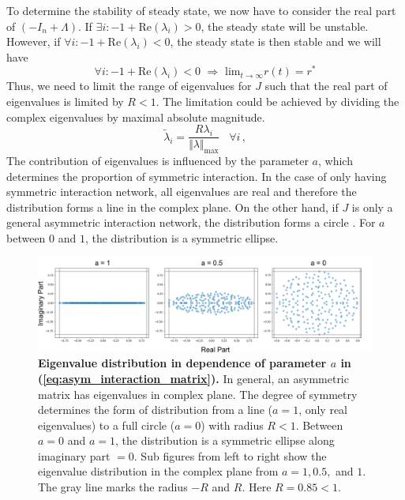 \documentclass[11pt]{article}
\begin{document}
	To determine the stability of steady state, we now have to consider the real part of $(-I_n + \Lambda)$. If $\exists i: -1 + \text{Re}(\lambda_i) > 0$, the steady state will be unstable. However, if $\forall i: -1 + \text{Re}(\lambda_i) < 0$, the steady state is then stable and we will have
		\begin{equation} \label{eq:asym_stable_fix_point}
			\forall i: -1 + \text{Re}(\lambda_i) < 0 \, \,  \Rightarrow \, \, \text{lim}_{t \rightarrow \infty} r(t) = r^*
		\end{equation}
	Thus, we need to limit the range of eigenvalues for $J$ such that the real part of eigenvalues is limited by $R < 1$. The limitation could be achieved by dividing the complex eigenvalues by maximal absolute magnitude.
		\begin{equation} \label{eq:asym_normalization}
			\tilde{\lambda}_i = \frac{R \lambda_i}{\Vert\lambda\Vert_{\text{max}}} \, \, \, \, \, \forall i \, ,
		\end{equation}  
	The contribution of eigenvalues is influenced by the parameter $a$, which determines the proportion of symmetric interaction. In the case of only having symmetric interaction network, all eigenvalues are real and therefore the distribution forms a line in the complex plane. On the other hand, if $J$ is only a general asymmetric interaction network, the distribution forms a circle \cite{rajan2006eigenvalue}. For $a$ between $0$ and $1$, the distribution is a symmetric ellipse. 
		\begin{figure} [H]
			\centering
			\includegraphics[width=\textwidth]{../figures/asym_eigval_distribution.pdf}
			\caption{\textbf{Eigenvalue distribution in dependence of parameter $a$ in (\ref{eq:asym_interaction_matrix}).} In general, an asymmetric matrix has eigenvalues in complex plane. The degree of symmetry determines the form of distribution from a line ($a = 1$, only real eigenvalues) to a full circle ($a = 0$) with radius $R < 1$. Between $a = 0$ and $a = 1$, the distribution is a symmetric ellipse along imaginary part $=0$. Sub figures from left to right show the eigenvalue distribution in the complex plane from $a = 1, 0.5,$ and $1$. The gray line marks the radius $-R$ and $R$. Here $R = 0.85 < 1$.}
		\end{figure}
	
\end{document}
